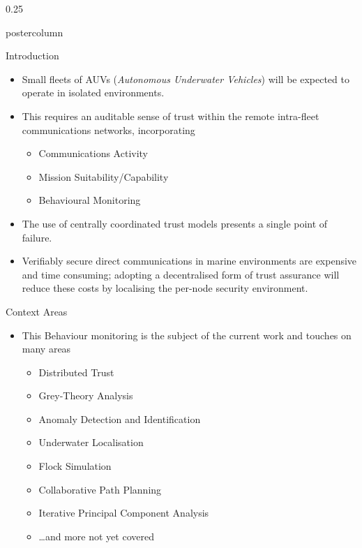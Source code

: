 \documentclass[final,hyperref={pdfpagelabels=false}]{beamer}
\def\colwidth{0.25\linewidth}
\begin{document}
\begin{frame}[fragile]
\begin{columns}[t]
\begin{column}{\colwidth}
\begin{beamercolorbox}[center,wd=\textwidth]{postercolumn}
\begin{minipage}[T]{.98\textwidth}
{\begin{block}{Introduction}
              \vspace{\lineskip}
              \begin{itemize}
                \item Small fleets of AUVs (\emph{Autonomous Underwater Vehicles}) will be expected to operate in isolated environments.
                \item This requires an auditable sense of trust within the remote intra-fleet communications networks, incorporating
                  \begin{itemize}
                    \item Communications Activity
                    \item Mission Suitability/Capability
                    \item Behavioural Monitoring
                  \end{itemize}
                \item The use of centrally coordinated trust models presents a single point of failure.
                \item Verifiably secure direct communications in marine environments are expensive and time consuming; adopting a decentralised form of trust assurance will reduce these costs by localising the per-node security environment.
              \end{itemize}
            \end{block}
\iffalse
            \begin{block}{Context Areas}
              \begin{itemize}
                \item This Behaviour monitoring is the subject of the current work and touches on many areas
                \begin{itemize}
                  \item Distributed Trust
                  \item Grey-Theory Analysis
                  \item Anomaly Detection and Identification
                  \item Underwater Localisation
                  \item Flock Simulation
                  \item Collaborative Path Planning
                  \item Iterative Principal Component Analysis
                  \item \dots and more not yet covered
                \end{itemize}

\end{itemize}
\end{block}}
\end{minipage}
\end{beamercolorbox}
\end{column}
\end{columns}
\end{frame}
\end{document}
